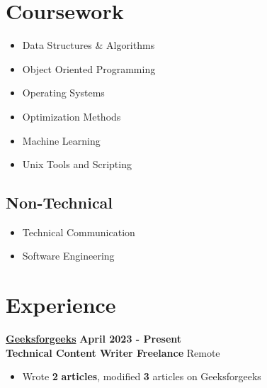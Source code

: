 \documentclass[]{article}
\newenvironment{tightemize}{
\vspace{-\topsep}
\begin{itemize}\itemsep0pt \parskip2pt \parsep2pt}
{\end{itemize}}
\newcommand{\company}[2]{
  {\Large{{#1}}
  \hfill \footnotesize{#2}}
}
\newcommand{\role}[2]{
  {\large {{#1}}
    \hfill \small{#2}
  }
}
\begin{document}
\begin{multicols}{2}
\begin{flushleft}
    \section*{Coursework} 
    \begin{tightemize}
      \item  {Data Structures \& Algorithms} 
      \item  {Object Oriented Programming}
      \item  {Operating Systems} 
      \item  {Optimization Methods} 
      \item  {Machine Learning}
      \item  {Unix Tools and Scripting} \\
    \end{tightemize}

    \subsection*{Non-Technical \\} 
    \begin{tightemize}
      \item  {Technical Communication} 
      \item  {Software Engineering}
    \end{tightemize}


    \section*{Experience}
    \company{\textbf{\href{https://auth.geeksforgeeks.org/user/rahulsah6003}{Geeksforgeeks}}}{\textbf{April 2023 - Present}} \\
    \role{\textbf{Technical Content Writer Freelance}}{Remote}
    \begin{tightemize}
      \item { Wrote \textbf{2} \textbf{articles}}, modified  \textbf{3} articles  on Geeksforgeeks
    \end{tightemize}


\end{flushleft}
\end{multicols}
\end{document}
